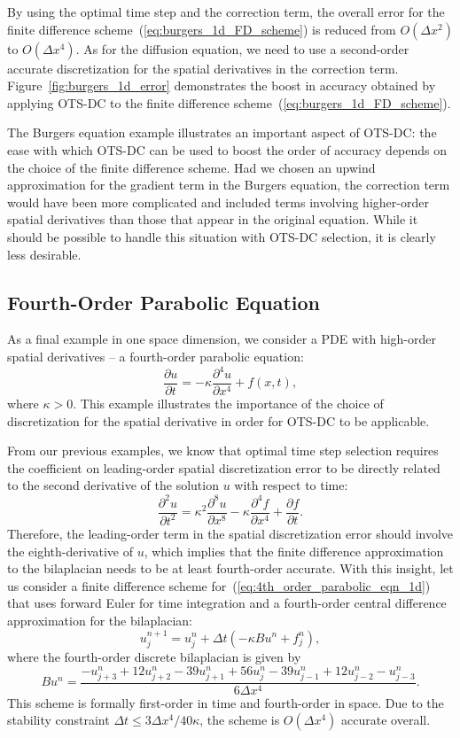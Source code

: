 \documentclass[fleqn,12pt,twoside]{article}
\newcommand{\beq}{\begin{equation}}
\newcommand{\eeq}{\end{equation}}
\def\pt{\partial t}
\def\px{\partial x}
\def\dt{\Delta t}
\def\dx{\Delta x}
\begin{document}
By using the optimal time step and the correction term, the overall error
for the finite difference scheme~(\ref{eq:burgers_1d_FD_scheme}) is reduced
from $O(\dx^2)$ to $O(\dx^4)$.  As for the diffusion equation, we need
to use a second-order accurate discretization for the spatial derivatives
in the correction term.  
Figure~\ref{fig:burgers_1d_error} demonstrates the boost in accuracy obtained 
by applying OTS-DC to the finite difference 
scheme~(\ref{eq:burgers_1d_FD_scheme}).

The Burgers equation example illustrates an important aspect of OTS-DC:
the ease with which OTS-DC can be used to boost the order of accuracy 
depends on the choice of the finite difference scheme.  Had we chosen an 
upwind approximation for the gradient term in the Burgers equation, the 
correction term would have been more complicated and included terms involving 
higher-order spatial derivatives than those that appear in the original 
equation.  While it should be possible to handle this situation with OTS-DC 
selection, it is clearly less desirable.


\subsection{Fourth-Order Parabolic Equation}
As a final example in one space dimension, we consider a PDE with high-order
spatial derivatives -- a fourth-order parabolic equation: 
\beq
  \frac{\partial u}{\pt} = -\kappa \frac{\partial^4 u}{\px^4} + f(x,t), 
  \label{eq:4th_order_parabolic_eqn_1d}
\eeq
where $\kappa > 0$.  This example illustrates the importance of the choice of
discretization for the spatial derivative in order for OTS-DC to be
applicable. 

From our previous examples, we know that optimal time step selection requires 
the coefficient on leading-order spatial discretization error to be directly 
related to the second derivative of the solution $u$ with respect to time:
\beq
  \frac{\partial^2 u}{\pt^2} = 
    \kappa^2 \frac{\partial^8 u}{\px^8} 
  - \kappa \frac{\partial^4 f}{\px^4} 
  + \frac{\partial f}{\pt}
  \label{eq:4th_order_parabolic_eqn_1d_second_time_derivative}.
\eeq
Therefore, the leading-order term in the spatial discretization 
error should involve the eighth-derivative of $u$, which implies that the
finite difference approximation to the bilaplacian needs to be at least 
fourth-order accurate.  With this insight, let us consider a finite 
difference scheme for~(\ref{eq:4th_order_parabolic_eqn_1d}) that 
uses forward Euler for time integration and a fourth-order central 
difference approximation for the bilaplacian:
\beq
  u^{n+1}_j = u^{n}_j + \dt \left( -\kappa B u^n + f_j^n \right), 
  \label{eq:4th_order_parabolic_eqn_1d_FD_scheme}
\eeq
where the fourth-order discrete bilaplacian is given by
\beq
  B u^n = \frac{ -u^{n}_{j+3} + 12 u^{n}_{j+2} - 39 u^{n}_{j+1}
               + 56 u^{n}_j
               - 39 u^{n}_{j-1} + 12 u^{n}_{j-2} -u^{n}_{j-3} }
               {6 \dx^4}.
\eeq
This scheme is formally first-order in time and fourth-order in space.  
Due to the stability constraint $\dt \le 3\dx^4/40 \kappa$, the scheme is 
$O(\dx^4)$ accurate overall.
\end{document}
